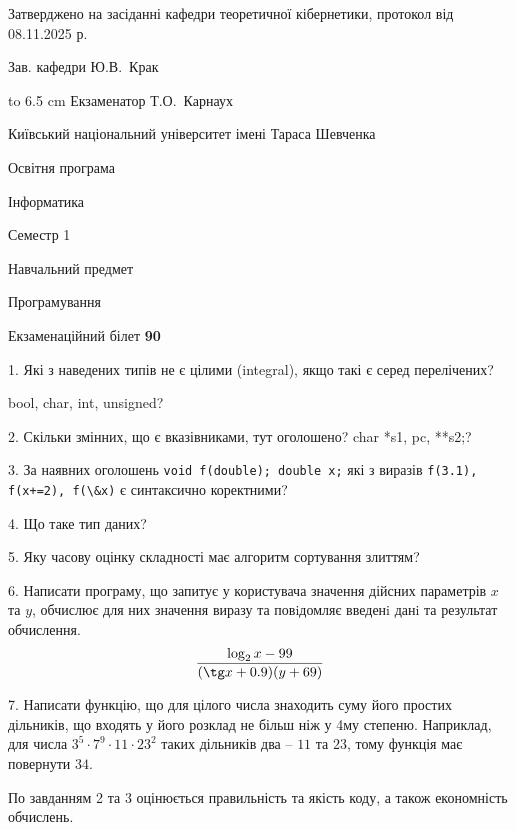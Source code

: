 \documentclass[12pt, ukrainian]{article}
\def\code#1{\Verb!#1!}
\begin{document}
{\smallskip\smallskip \begin {scriptsize} Затверджено на засіданні кафедри теоретичної кібернетики, протокол   від   08.11.2025 р.\par\smallskip\smallskip\smallskip\smallskip
{\parbox {6.5 cm} {Зав. кафедри \dotfill Ю.В.~Крак}}\hspace {0.7cm} {\hbox to 6.5 cm { Екзаменатор \dotfill Т.О.~Карнаух}} \end{scriptsize}}
\vspace{0.9cm}
{{\begin {scriptsize}\par
{ \center  Київський національний університет імені Тараса Шевченка \par}
{\parbox {5 cm}{Освітня програма \hfill}{\parbox {7 cm}{Інформатика\hfill}}\parbox {6 cm}{\hfill Семестр 1}}\par
{\parbox {5 cm} {Навчальний предмет \hfill}\parbox {7 cm}{Програмування \hfill}\parbox {6cm}{\hfill}\par}\vspace{-15pt} \end{scriptsize}}{\center Екзаменаційний білет \No \textbf { 90 }\par}}
{%
1. Які з наведених типів не є цілими (integral), якщо такі є серед перелічених?

bool, char, int, unsigned?
\par
\vspace{2mm}
2. Скільки змінних, що є вказівниками, тут оголошено?
char *s1, pc, **s2;?
\par
\vspace{2mm}
3. За наявних оголошень \code{void f(double); double x;} які з виразів \code{f(3.1), f(x+=2), f(\&x)} є синтаксично коректними?
\par
\vspace{2mm}
4. Що таке тип даних?
\par
\vspace{2mm}
5. Яку часову оцінку складності має алгоритм сортування злиттям?
\par
\vspace{2mm}
6. Написати програму, що запитує у користувача значення дійсних параметрів $x$ та $y$, обчислює для них значення виразу та повiдомляє введенi данi та результат обчислення.
$$\frac{\log_{2} x - 99}{(\tg x + 0.9) (y + 69)}$$ 

\par
7. Написати функцію, що для цілого числа знаходить суму його простих дільників, що входять у його розклад не більш ніж у 4му степеню. Наприклад, для числа $3^5{\cdot}7^9{\cdot}11{\cdot}23^{2}$ таких дільників два – $11$ та $23$, тому функція має повернути $34$.

По завданням 2 та 3 оцінюється правильність та якість коду, а також економність обчислень.

}
\end{document}
